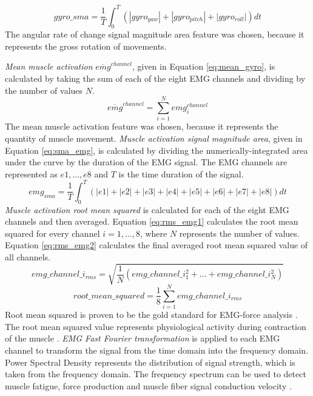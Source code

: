 \begin{equation}\label{eq:sma_gyro}
gyro\_sma = \frac{1}{T}\int_{0}^{T}(|gyro_{yaw}|+|gyro_{pitch}|+|gyro_{roll}|)dt
\end{equation}
The angular rate of change signal magnitude area feature was chosen, because it represents the gross rotation of movements.
\par \emph{Mean muscle activation} $\overline{emg}^{channel}$, given in Equation \ref{eq:mean_gyro}, is calculated by taking the sum of each of the eight EMG channels and dividing by the number of values $N$.
\begin{equation}\label{eq:mean_emg}
\overline{emg}^{channel} = \sum_{i=1}^{N}emg^{channel}_i
\end{equation}
The mean muscle activation feature was chosen, because it represents the quantity of muscle movement.
\emph{Muscle activation signal magnitude area}, given in Equation \ref{eq:sma_emg}, is calculated by dividing the numerically-integrated area under the curve by the duration of the EMG signal. The EMG channels are represented as $e1,\dots,e8$ and $T$ is the time duration of the signal.
\begin{equation}\label{eq:sma_emg}
emg_{sma} = \frac{1}{T}\int_{0}^{T}(|e1|+|e2|+|e3|+|e4|+|e5|+|e6|+|e7|+|e8|)dt
\end{equation}
\emph{Muscle activation root mean squared} is calculated for each of the eight EMG channels and then averaged. Equation \ref{eq:rms_emg1} calculates the root mean squared for every channel $i=1,\dots,8$, where $N$ represents the number of values. Equation \ref{eq:rms_emg2} calculates the final averaged root mean squared value of all channels.
\begin{equation}\label{eq:rms_emg1}
emg\_channel\_i_{rms} = \sqrt{\frac{1}{N}(emg\_channel\_i_1^2+\dots+emg\_channel\_i_N^2)}
\end{equation}
\begin{equation}\label{eq:rms_emg2}
root\_mean\_squared = \frac{1}{8}\sum_{i=1}^{N}emg\_channel\_i_{rms}
\end{equation}
Root mean squared is proven to be the gold standard for EMG-force analysis \cite{KALLENBERG2008780}. The root mean squared value represents physiological activity during contraction of the muscle \cite{Totty2017}.
\emph{EMG Fast Fourier transformation} is applied to each EMG channel to transform the signal from the time domain into the frequency domain. Power Spectral Density represents the distribution of signal strength, which is taken from the frequency domain. The frequency spectrum can be used to detect muscle fatigue, force production and muscle fiber signal conduction velocity \cite{Gler2005}.
